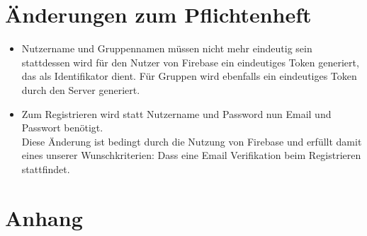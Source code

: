 \documentclass[a4paper]{scrreprt}
\begin{document}
\chapter{Änderungen zum Pflichtenheft}
\begin{itemize}
	\item Nutzername und Gruppennamen müssen nicht mehr eindeutig sein \\
	stattdessen wird für den Nutzer von Firebase ein eindeutiges Token generiert, das als Identifikator dient. Für Gruppen wird ebenfalls ein eindeutiges Token durch den Server generiert.
	\item Zum Registrieren wird statt Nutzername und Password nun Email und Passwort benötigt. \\Diese Änderung ist bedingt durch die Nutzung von Firebase und erfüllt damit eines unserer Wunschkriterien: Dass eine Email Verifikation beim Registrieren stattfindet. 
\end{itemize}

\printglossaries

\chapter{Anhang}
\end{document}
